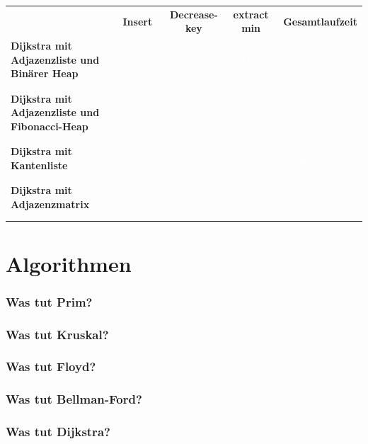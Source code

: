 \documentclass{article}
\begin{document}
\begin{table}[H]
    \begin{tabular}{ p{5cm} | c c c c  }
         & \textbf{Insert}  & \textbf{Decrease-key} & \textbf{extract min} & \textbf{Gesamtlaufzeit}  \\
        \textbf{Dijkstra mit Adjazenzliste und Binärer Heap} & \textcolor{white}{plazhalter} & \textcolor{white}{plazhalter}   &  \textcolor{white}{plazhalter} &  \textcolor{white}{plazhalter} \\ \\ \\
        \textbf{Dijkstra mit Adjazenzliste und Fibonacci-Heap} &    & & &  \textcolor{white}{plazhalter}  \\ \\ \\
        \textbf{Dijkstra mit Kantenliste} & & & &  \textcolor{white}{plazhalter}   \\ \\ \\
        \textbf{Dijkstra mit Adjazenzmatrix} & &  & &  \textcolor{white}{plazhalter} \\ \\ \\
    \end{tabular}
    \label{tab:my_label}
\end{table}

\section{Algorithmen}
\subsubsection*{Was tut Prim?} 
\bigskip \bigskip
\subsubsection*{Was tut Kruskal?} 
\bigskip \bigskip
\subsubsection*{Was tut Floyd?} 
\bigskip \bigskip
\subsubsection*{Was tut Bellman-Ford?} 
\bigskip \bigskip
\subsubsection*{Was tut Dijkstra?} 
\bigskip \bigskip
\end{document}
